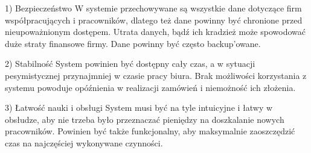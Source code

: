 
1) Bezpieczeństwo
	W systemie przechowywane są wszystkie dane dotyczące firm współpracujących i pracowników, dlatego też dane powinny być chronione przed nieupoważnionym dostępem.
	Utrata danych, bądź ich kradzież może spowodować duże straty finansowe firmy.
	Dane powinny być często backup'owane.

2) Stabilność
	System powinien być dostępny cały czas, a w sytuacji pesymistycznej przynajmniej w czasie pracy biura.
	Brak możliwości korzystania z systemu powoduje opóźnienia w realizacji zamówień i niemożność ich złożenia.

3) Łatwość nauki i obsługi
	System musi być na tyle intuicyjne i łatwy w obsłudze, aby nie trzeba było przeznaczać pieniędzy na doszkalanie nowych pracowników.
	Powinien być także funkcjonalny, aby maksymalnie zaoszczędzić czas na najczęściej wykonywane czynności.
